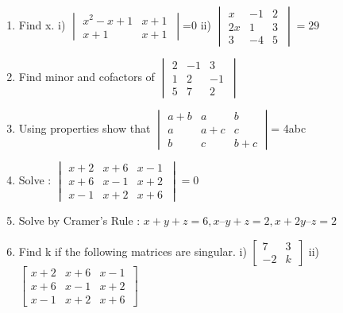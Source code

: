 \documentclass[14pt]{article}
\begin{document}
\begin{multicols}{2}
\begin{enumerate}[resume]
\item Find x.
i) $\begin{vmatrix} x^2-x+1 & x+1 \\x+1 & x+1 \,\end{vmatrix}$=0 
ii) $\begin{vmatrix} x & -1 & 2 \\ 2x & 1 & 3\,\\ 3 & -4 & 5\end{vmatrix}=29$ 

\item Find minor and cofactors of
 $\begin{vmatrix} 2 & -1 & 3 \\ 1 & 2 & -1\,\\ 5 & 7 & 2\end{vmatrix}$ 

\item Using properties show that
 $\begin{vmatrix} a+b & a & b \\ a & a+c & c\,\\ b & c & b+c\end{vmatrix}$= 4abc

\item Solve : 
 $\begin{vmatrix} x+2 & x+6 & x-1 \\ x+6 & x-1 & x+2\,\\ x-1 & x+2 & x+6\end{vmatrix}= 0$

\item Solve by Cramer's Rule :  $x+y+z = 6, x–y+z = 2, x+2y–z = 2$

\item Find k if the following matrices are singular. 
i) $\begin{bmatrix} 7 & 3 \\-2 & k \,\end{bmatrix}$
ii) $\begin{bmatrix} x+2 & x+6 & x-1 \\ x+6 & x-1 & x+2\,\\ x-1 & x+2 & x+6\end{bmatrix}$

 
 
\end{enumerate} 













\end{multicols}
\end{document}
